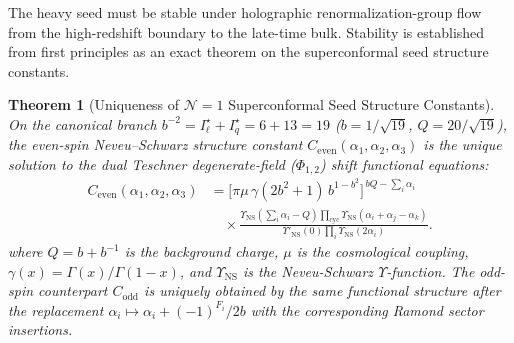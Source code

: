 \documentclass[11pt,letterpaper]{article}
\theoremstyle{plain}
\newtheorem{theorem}{Theorem}
\begin{document}
The heavy seed must be stable under holographic renormalization-group flow
from the high-redshift boundary to the late-time bulk.  Stability is established
from first principles as an exact theorem on the superconformal seed structure constants.

\begin{theorem}[Uniqueness of $\mathcal{N}=1$ Superconformal Seed Structure Constants]
\label{thm:superconformal-seed-uniqueness}
On the canonical branch $b^{-2} = I_\ell^\star + I_q^\star = 6 + 13 = 19$ ($b = 1/\sqrt{19}$, $Q = 20/\sqrt{19}$), the even-spin Neveu--Schwarz structure constant $C_{\text{even}}(\alpha_1,\alpha_2,\alpha_3)$ is the unique solution to the dual Teschner degenerate-field ($\Phi_{1,2}$) shift functional equations:
\begin{equation}
\label{eq:c-even-three-point}
\begin{aligned}
C_{\text{even}}(\alpha_1,\alpha_2,\alpha_3)
&=
\bigl[\pi\mu\,\gamma(2b^{2}+1)\,b^{1-b^{2}}\bigr]^{\,bQ-\sum_i\alpha_i}
\\[-0.1em]
&\quad\times
\frac{
\displaystyle
\Upsilon_{\text{NS}}\!\left(\sum_i\alpha_i-Q\right)
\prod\limits_{\text{cyc}} \Upsilon_{\text{NS}}\!(\alpha_i+\alpha_j-\alpha_k)
}{
\displaystyle
\Upsilon'_{\text{NS}}(0)
\prod\limits_{i} \Upsilon_{\text{NS}}\!(2\alpha_i)
}.
\end{aligned}
\end{equation}
where $Q=b+b^{-1}$ is the background charge, $\mu$ is the cosmological
coupling, $\gamma(x)=\Gamma(x)/\Gamma(1-x)$, and $\Upsilon_{\text{NS}}$ is the
Neveu-Schwarz \(\Upsilon\)-function.  The odd-spin counterpart $C_{\text{odd}}$
is uniquely obtained by the same functional structure after the replacement
$\alpha_i\mapsto\alpha_i+(-1)^{F_i}/2b$ with the corresponding Ramond sector
insertions.
\end{theorem}
\end{document}
